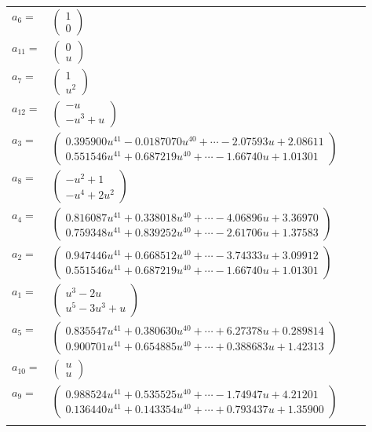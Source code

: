 \documentclass[1p]{elsarticle_modified}
\theoremstyle{definition}
\begin{document}
\begin{tabular}{m{7pt} m{180pt} m{7pt} m{180pt} }
\flushright $a_{6}=$&$\begin{pmatrix}1\\0\end{pmatrix}$ \\
\flushright $a_{11}=$&$\begin{pmatrix}0\\u\end{pmatrix}$ \\
\flushright $a_{7}=$&$\begin{pmatrix}1\\u^2\end{pmatrix}$ \\
\flushright $a_{12}=$&$\begin{pmatrix}- u\\- u^3+u\end{pmatrix}$ \\
\flushright $a_{3}=$&$\begin{pmatrix}0.395900 u^{41}-0.0187070 u^{40}+\cdots-2.07593 u+2.08611\\0.551546 u^{41}+0.687219 u^{40}+\cdots-1.66740 u+1.01301\end{pmatrix}$ \\
\flushright $a_{8}=$&$\begin{pmatrix}- u^2+1\\- u^4+2 u^2\end{pmatrix}$ \\
\flushright $a_{4}=$&$\begin{pmatrix}0.816087 u^{41}+0.338018 u^{40}+\cdots-4.06896 u+3.36970\\0.759348 u^{41}+0.839252 u^{40}+\cdots-2.61706 u+1.37583\end{pmatrix}$ \\
\flushright $a_{2}=$&$\begin{pmatrix}0.947446 u^{41}+0.668512 u^{40}+\cdots-3.74333 u+3.09912\\0.551546 u^{41}+0.687219 u^{40}+\cdots-1.66740 u+1.01301\end{pmatrix}$ \\
\flushright $a_{1}=$&$\begin{pmatrix}u^3-2 u\\u^5-3 u^3+u\end{pmatrix}$ \\
\flushright $a_{5}=$&$\begin{pmatrix}0.835547 u^{41}+0.380630 u^{40}+\cdots+6.27378 u+0.289814\\0.900701 u^{41}+0.654885 u^{40}+\cdots+0.388683 u+1.42313\end{pmatrix}$ \\
\flushright $a_{10}=$&$\begin{pmatrix}u\\u\end{pmatrix}$ \\
\flushright $a_{9}=$&$\begin{pmatrix}0.988524 u^{41}+0.535525 u^{40}+\cdots-1.74947 u+4.21201\\0.136440 u^{41}+0.143354 u^{40}+\cdots+0.793437 u+1.35900\end{pmatrix}$\\&\end{tabular}
\end{document}
